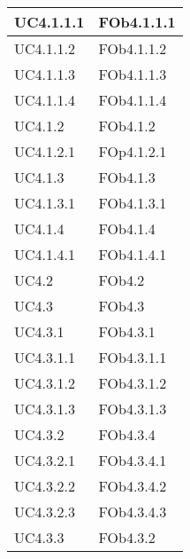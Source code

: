 \begin{longtable}{|l|p{4cm}|}
\hline
		UC4.1.1.1 & FOb4.1.1.1 \linebreak   \\
\hline
		UC4.1.1.2 & FOb4.1.1.2 \linebreak   \\
\hline
		UC4.1.1.3 & FOb4.1.1.3 \linebreak   \\
\hline
		UC4.1.1.4 & FOb4.1.1.4 \linebreak   \\
\hline
		UC4.1.2 & FOb4.1.2 \linebreak   \\
\hline
		UC4.1.2.1 & FOp4.1.2.1 \linebreak   \\
\hline
		UC4.1.3 & FOb4.1.3 \linebreak   \\
\hline
		UC4.1.3.1 & FOb4.1.3.1 \linebreak   \\
\hline
		UC4.1.4 & FOb4.1.4 \linebreak   \\
\hline
		UC4.1.4.1 & FOb4.1.4.1 \linebreak   \\
\hline
		UC4.2 & FOb4.2 \linebreak   \\
\hline
		UC4.3 & FOb4.3 \linebreak   \\
\hline
		UC4.3.1 & FOb4.3.1 \linebreak   \\
\hline
		UC4.3.1.1 & FOb4.3.1.1 \linebreak   \\
\hline
		UC4.3.1.2 & FOb4.3.1.2 \linebreak   \\
\hline
		UC4.3.1.3 & FOb4.3.1.3 \linebreak   \\
\hline
		UC4.3.2 & FOb4.3.4 \linebreak   \\
\hline
		UC4.3.2.1 & FOb4.3.4.1 \linebreak   \\
\hline
		UC4.3.2.2 & FOb4.3.4.2 \linebreak   \\
\hline
		UC4.3.2.3 & FOb4.3.4.3 \linebreak   \\
\hline
		UC4.3.3 & FOb4.3.2 \linebreak   \\

\end{longtable}

